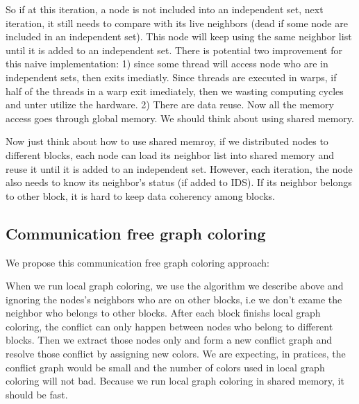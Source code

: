 \documentclass[12pt] {article}
\begin{document}
So if at this iteration, a node is not included into an independent set, next iteration, it still needs to compare with its live neighbors (dead if some node are included in an independent set). This node will keep using the same neighbor list until it is added to an independent set. There is potential two improvement for this naive implementation: 1) since some thread will access node who are in independent sets, then exits imediatly. Since threads are executed in warps, if half of the threads in a warp exit imediately, then we wasting computing cycles and unter utilize the hardware. 2) There are data reuse. Now all the memory access goes through global memory. We should think about using shared memory.

Now just think about how to use shared memroy, if we distributed nodes to different blocks, each node can load its neighbor list into shared memory and reuse it until it is added to an independent set. However, each iteration, the node also needs to know its neighbor's status (if added to IDS). If its neighbor belongs to other block, it is hard to keep data coherency among blocks. 

\subsection{Communication free graph coloring}
We propose this communication free graph coloring approach:
\begin{figure}[!tbh]
\centering        
   \caption{ }
   \label{fig:fig2}
\end{figure} 

When we run local graph coloring, we use the algorithm we describe above and ignoring the nodes's neighbors who are on other blocks, i.e we don't exame the neighbor who belongs to other blocks. After each block finishs local graph coloring, the conflict can only happen between nodes who belong to different blocks. Then we extract those nodes only and form a new conflict graph and resolve those conflict by assigning new colors. We are expecting, in pratices, the conflict graph would be small and the number of colors used in local graph coloring will not bad. Because we run local graph coloring in shared memory, it should be fast. 
\end{document}
